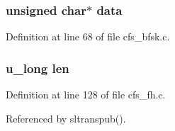 \subsubsection{\setlength{\rightskip}{0pt plus 5cm}unsigned char$\ast$ {\bf data}}\label{cfs__bfsk_8c_a1}




Definition at line 68 of file cfs\_\-bfsk.c.
\subsubsection{\setlength{\rightskip}{0pt plus 5cm}u\_\-long {\bf len}}\label{cfs__bfsk_8c_a0}




Definition at line 128 of file cfs\_\-fh.c.

Referenced by sltranspub().